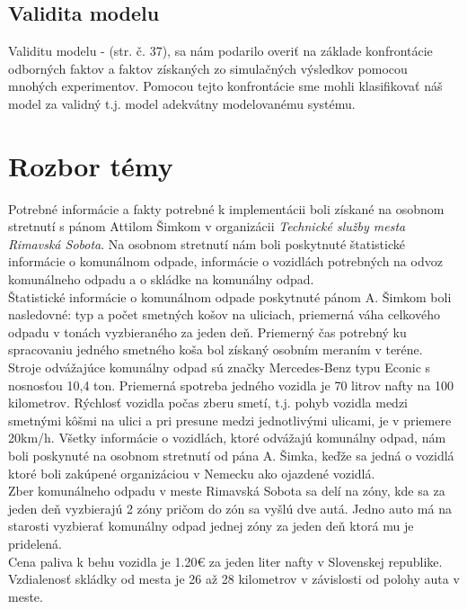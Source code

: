 \documentclass[11pt,a4paper]{article}
\begin{document}
    \subsection{Validita modelu}

        \indent Validitu modelu - \cite{IMS}(str. č. 37), sa nám podarilo overiť na základe konfrontácie odborných faktov a faktov získaných zo simulačných výsledkov pomocou mnohých experimentov. Pomocou tejto konfrontácie sme mohli klasifikovať náš model za validný t.j. model adekvátny modelovanému systému.

\section{Rozbor témy}

    \indent Potrebné informácie a fakty potrebné k implementácii boli získané na osobnom stretnutí s pánom Attilom Šimkom v organizácii \textit{Technické služby mesta Rimavská Sobota}\cite{TSMRS}. Na osobnom stretnutí nám boli poskytnuté štatistické informácie o komunálnom odpade, informácie o vozidlách potrebných na odvoz komunálneho odpadu a o skládke na komunálny odpad.\\[0.4em]
    \indent Štatistické informácie o komunálnom odpade poskytnuté pánom A. Šimkom boli nasledovné: typ a počet smetných košov na uliciach, priemerná váha celkového odpadu v tonách vyzbieraného za jeden deň. Priemerný čas potrebný ku spracovaniu jedného smetného koša bol získaný osobním meraním v teréne.\\[0.4em]
    \indent Stroje odvážajúce komunálny odpad sú značky Mercedes-Benz typu Econic s nosnosťou 10,4 ton. Priemerná spotreba jedného vozidla je 70 litrov nafty na 100 kilometrov. Rýchlosť vozidla počas zberu smetí, t.j. pohyb vozidla medzi smetnými kôšmi na ulici a pri presune medzi jednotlivými ulicami, je v priemere 20km/h. Všetky informácie o vozidlách, ktoré odvážajú komunálny odpad, nám boli poskynuté na osobnom stretnutí od pána A. Šimka, keďže sa jedná o vozidlá ktoré boli zakúpené organizáciou v Nemecku ako ojazdené vozidlá.\\[0.4em]
    \indent Zber komunálneho odpadu v meste Rimavská Sobota sa delí na zóny\cite{ZONA}, kde sa za jeden deň vyzbierajú 2 zóny pričom do zón sa vyšlú dve autá. Jedno auto má na starosti vyzbierať komunálny odpad jednej zóny za jeden deň ktorá mu je pridelená.\\[0.4em]
    \indent Cena paliva k behu vozidla je 1.20\euro{} za jeden liter nafty\cite{NAFTA} v Slovenskej republike. Vzdialenosť skládky od mesta je 26 až 28 kilometrov v závislosti od polohy auta v meste.
\end{document}

